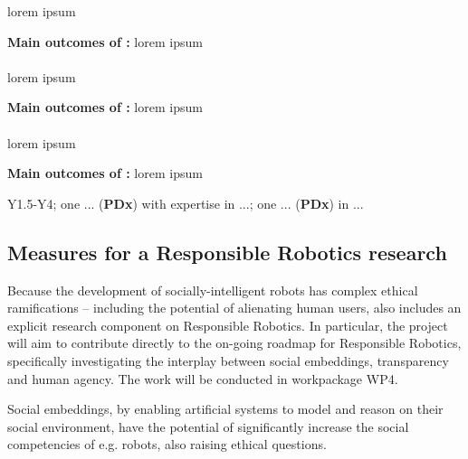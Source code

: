 lorem ipsum

\begin{framed}
    {\noindent\bf Main outcomes of \tZA:} lorem ipsum 
\end{framed}

\paragraph{\TZB}

lorem ipsum

\begin{framed}
    {\noindent\bf Main outcomes of \tZB:} lorem ipsum 
\end{framed}

\paragraph{\TZC}

lorem ipsum

\begin{framed}
    {\noindent\bf Main outcomes of \tZC:} lorem ipsum 
\end{framed}


\begin{framed}
     Y1.5-Y4; one ... ({\bf PDx}) with expertise in
    ...; one ... ({\bf PDx}) in ...
\end{framed}



\subsection{Measures for a Responsible Robotics research}


Because the development of socially-intelligent robots has
complex ethical ramifications -- including the potential of alienating
human users, \project also includes an explicit research component on
Responsible Robotics. In particular, the project will aim to contribute directly
to the on-going roadmap for Responsible Robotics, specifically
investigating the interplay between social embeddings, transparency and human
agency. The work will be conducted in workpackage WP4.


Social embeddings, by enabling artificial systems to model and reason on their
social environment, have the potential of significantly increase the social
competencies of e.g. robots, also raising ethical questions.

